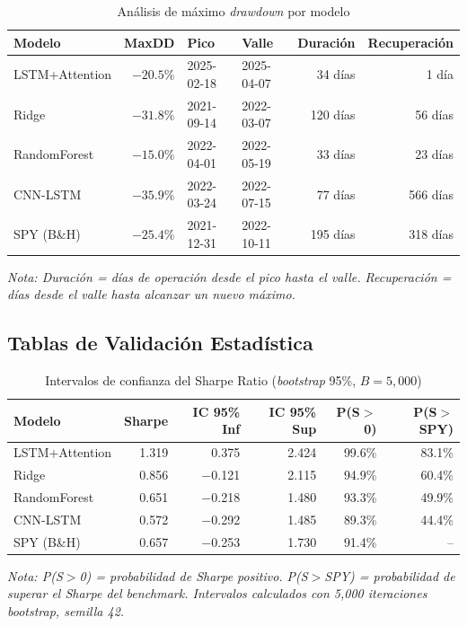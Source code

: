 \begin{table}[H]
\centering
\caption{An\'alisis de m\'aximo \textit{drawdown} por modelo}
\label{tab:drawdown_detail}
\small
\begin{tabular}{@{}lrllrr@{}}
\toprule
\textbf{Modelo} & \textbf{MaxDD} & \textbf{Pico} & \textbf{Valle} & \textbf{Duraci\'on} & \textbf{Recuperaci\'on} \\
\midrule
LSTM+Attention & $-20.5\%$ & 2025-02-18 & 2025-04-07 & 34 d\'ias & 1 d\'ia \\
Ridge & $-31.8\%$ & 2021-09-14 & 2022-03-07 & 120 d\'ias & 56 d\'ias \\
RandomForest & $-15.0\%$ & 2022-04-01 & 2022-05-19 & 33 d\'ias & 23 d\'ias \\
CNN-LSTM & $-35.9\%$ & 2022-03-24 & 2022-07-15 & 77 d\'ias & 566 d\'ias \\
\midrule
SPY (B\&H) & $-25.4\%$ & 2021-12-31 & 2022-10-11 & 195 d\'ias & 318 d\'ias \\
\bottomrule
\end{tabular}
\vspace{0.2cm}
\parbox{0.9\textwidth}{\footnotesize\textit{Nota: Duraci\'on = d\'ias de operaci\'on desde el pico hasta el valle. Recuperaci\'on = d\'ias desde el valle hasta alcanzar un nuevo m\'aximo.}}
\end{table}


\subsection{Tablas de Validaci\'on Estad\'istica}
\label{sec:appendix_validation_tables}

\begin{table}[H]
\centering
\caption{Intervalos de confianza del Sharpe Ratio (\textit{bootstrap} 95\%, $B = 5{,}000$)}
\label{tab:sharpe_ci}
\small
\begin{tabular}{@{}lrrrrr@{}}
\toprule
\textbf{Modelo} & \textbf{Sharpe} & \textbf{IC 95\% Inf} & \textbf{IC 95\% Sup} & \textbf{P(S$>$0)} & \textbf{P(S$>$SPY)} \\
\midrule
LSTM+Attention & 1.319 & 0.375 & 2.424 & 99.6\% & 83.1\% \\
Ridge & 0.856 & $-$0.121 & 2.115 & 94.9\% & 60.4\% \\
RandomForest & 0.651 & $-$0.218 & 1.480 & 93.3\% & 49.9\% \\
CNN-LSTM & 0.572 & $-$0.292 & 1.485 & 89.3\% & 44.4\% \\
\midrule
SPY (B\&H) & 0.657 & $-$0.253 & 1.730 & 91.4\% & -- \\
\bottomrule
\end{tabular}
\vspace{0.2cm}
\parbox{0.9\textwidth}{\footnotesize\textit{Nota: P(S$>$0) = probabilidad de Sharpe positivo. P(S$>$SPY) = probabilidad de superar el Sharpe del benchmark. Intervalos calculados con 5{,}000 iteraciones bootstrap, semilla 42.}}
\end{table}

